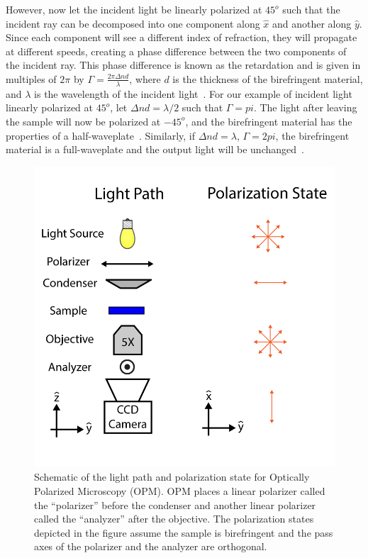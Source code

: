 However, now let the incident light be linearly polarized at $45^o$ such that the incident ray can be decomposed into one component along $\hat{x}$ and another along $\hat{y}$.
Since each component will see a different index of refraction, they will propagate at different speeds, creating a phase difference between the two components of the incident ray.
This phase difference is known as the retardation and is given in multiples of $2 \pi$ by $\Gamma = \frac{2 \pi \Delta n d}{\lambda}$, where $d$ is the thickness of the birefringent material, and $\lambda$ is the wavelength of the incident light~\cite{RN232}.
For our example of incident light linearly polarized at $45^o$, let $\Delta n d = \lambda / 2$ such that $\Gamma =  pi$.
The light after leaving the sample will now be polarized at $-45^o$, and the birefringent material has the properties of a half-waveplate~\cite{RN232}.
Similarly, if $\Delta n d = \lambda$, $\Gamma =  2 pi$, the birefringent material is a full-waveplate and the output light will be unchanged~\cite{RN232}.\\

\begin{figure}[h]
  \centering
  \includegraphics{figures/C2/Ch2-Figs_OPMSchem.png}
  \caption{Schematic of the light path and polarization state for Optically Polarized Microscopy (OPM). OPM places a linear polarizer called the ``polarizer'' before the condenser and another linear polarizer called the ``analyzer'' after the objective. The polarization states depicted in the figure assume the sample is birefringent and the pass axes of the polarizer and the analyzer are orthogonal.}\label{f:2-OPMSchem}
\end{figure}

